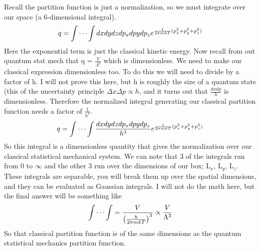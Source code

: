 \documentclass{article}
\begin{document}
Recall the partition function is just a normalization, so we must integrate over our space (a 6-dimensional integral). 
\begin{equation}
    q = \idotsint dxdydzdp_xdpydp_z e^{\frac{1}{2\pi mkT}(p_x^2+p_y^2+p_z^2)}
\end{equation}
Here the exponential term is just the classical kinetic energy. 
Now recall from out quantum stat mech that q = $\frac{V}{\Lambda^3}$ which is dimensionless. 
We need to make our classical expression dimensionless too. 
To do this we will need to divide by a factor of h. 
I will not prove this here, but h is roughly the size of a quantum state (this of the uncertainty principle $\Delta x \Delta p \propto h$, and it turns out that $\frac{dxdp}{h}$ is dimensionless. 
Therefore the normalized integral generating our classical partition function needs a factor of $\frac{1}{h^3}$. 
\begin{equation}
    q = \idotsint \frac{dxdydzdp_xdpydp_z}{h^3} e^{\frac{1}{2\pi mkT}(p_x^2+p_y^2+p_z^2)}
\end{equation}
So this integral is a dimensionless quantity that gives the normalization over our classical statistical mechanical system.
We can note that 3 of the integrals run from 0 to $\infty$ and the other 3 run over the dimensions of our box; L$_x$, L$_y$, L$_z$. 
These integrals are separable, you will break them up over the spatial dimensions, and they can be evaluated as Gaussian integrals. 
I will not do the math here, but the final answer will be something like 
\begin{equation}
    \idotsint = \frac{V}{\left(\frac{h}{2\pi m kT}\right)^3} \propto \frac{V}{\Lambda^3}
\end{equation}
So that classical partition function is of the same dimensions as the quantum statistical mechanics partition function. 
\end{document}
